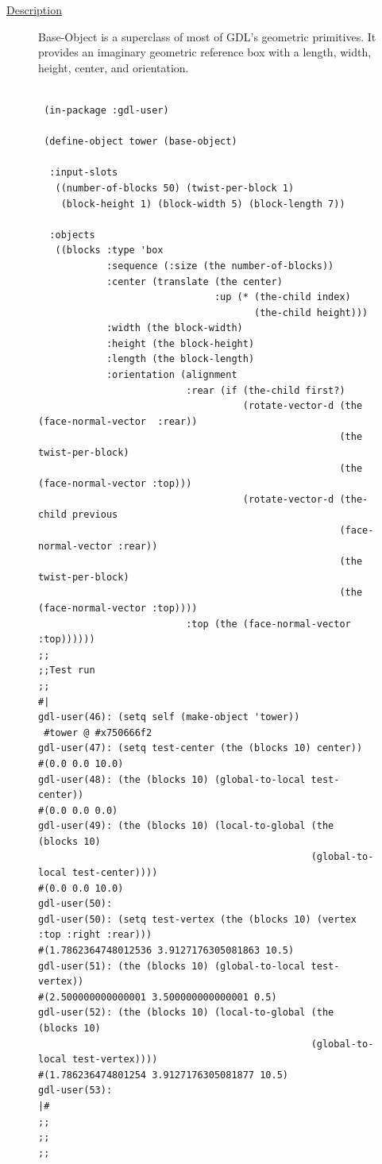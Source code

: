 \documentclass [11pt]{book}
\begin{document}
\begin{itemize}
\begin{description}

\item [
\underline{Description}]


Base-Object is a superclass of most of GDL's geometric primitives. It 
provides an imaginary geometric reference box with a length, width, height, center, 
and orientation.



\end{description}




\begin{figure}
\begin{lrbox}{\boxedverb}
\begin{minipage}{\linewidth}
{\small

\begin{verbatim}

 (in-package :gdl-user)

 (define-object tower (base-object)
  
  :input-slots 
   ((number-of-blocks 50) (twist-per-block 1)
    (block-height 1) (block-width 5) (block-length 7))
  
  :objects
   ((blocks :type 'box
            :sequence (:size (the number-of-blocks))
            :center (translate (the center) 
                               :up (* (the-child index) 
                                      (the-child height)))
            :width (the block-width) 
            :height (the block-height) 
            :length (the block-length)
            :orientation (alignment 
                          :rear (if (the-child first?)
                                    (rotate-vector-d (the (face-normal-vector  :rear))
                                                     (the twist-per-block)
                                                     (the (face-normal-vector :top)))
                                    (rotate-vector-d (the-child previous 
                                                     (face-normal-vector :rear))
                                                     (the twist-per-block)
                                                     (the (face-normal-vector :top))))
                          :top (the (face-normal-vector :top))))))
;;
;;Test run
;;
#|
gdl-user(46): (setq self (make-object 'tower))
 #tower @ #x750666f2
gdl-user(47): (setq test-center (the (blocks 10) center))
#(0.0 0.0 10.0)
gdl-user(48): (the (blocks 10) (global-to-local test-center))
#(0.0 0.0 0.0)
gdl-user(49): (the (blocks 10) (local-to-global (the (blocks 10) 
                                                (global-to-local test-center))))
#(0.0 0.0 10.0)
gdl-user(50): 
gdl-user(50): (setq test-vertex (the (blocks 10) (vertex :top :right :rear)))
#(1.7862364748012536 3.9127176305081863 10.5)
gdl-user(51): (the (blocks 10) (global-to-local test-vertex))
#(2.500000000000001 3.500000000000001 0.5)
gdl-user(52): (the (blocks 10) (local-to-global (the (blocks 10) 
                                                (global-to-local test-vertex))))
#(1.786236474801254 3.9127176305081877 10.5)
gdl-user(53): 
|#
;;
;;
;;



\end{verbatim}}
\end{minipage}
\end{lrbox}
\end{figure}
\end{itemize}
\end{document}
